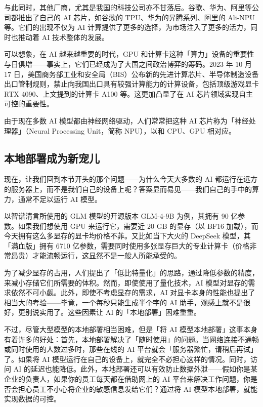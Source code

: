 与此同时，其他厂商，尤其是我国的科技公司亦不甘落后。谷歌、华为、阿里等公司都推出了自己的 AI 芯片，如谷歌的 TPU、华为的昇腾系列、阿里的 Ali-NPU 等。它们的出现不仅为 AI 计算提供了更多的选择，为市场注入了更多的活力，同时也推动着 AI 技术整体的发展。

\begin{note}
  可以想象，在 AI 越来越重要的时代，GPU 和计算卡这种「算力」设备的重要性与日俱增——事实上，它们已经成为了大国之间政治博弈的筹码。2023 年 10 月 17 日，美国商务部工业和安全局（BIS）公布新的先进计算芯片、半导体制造设备出口管制规则，禁止向我国出口具有较强计算能力的计算设备，包括顶级游戏显卡 RTX 4090、上文提到的计算卡 A100 等。这更加凸显了在 AI 芯片领域实现自主可控的重要性。
\end{note}

由于现在多数 AI 模型都由神经网络驱动，人们常常把这种 AI 芯片称为「神经处理器」（Neural Processing Unit，简称 NPU），以和 CPU、GPU 相对应。

\subsection{本地部署成为新宠儿}

现在，让我们回到本节开头的那个问题——为什么今天大多数的 AI 都运行在远方的服务器上，而不是我们自己的设备上呢？答案显而易见——我们自己的手中的算力，通常不足以运行 AI 模型。

以智谱清言所使用的 GLM 模型的开源版本 GLM-4-9B 为例，其拥有 90 亿参数。如果我们想使用 GPU 来运行它，需要近 20 GB 的显存（以 BF16 加载），而今天拥有这么多显存的显卡均价格不菲。又比如当下大火的 DeepSeek 模型，其「满血版」拥有 6710 亿参数，需要同时使用多张显存巨大的专业计算卡（价格非常昂贵）才能流畅运行，这显然不是一般人所能承受的。

为了减少显存的占用，人们提出了「低比特量化」的思路，通过降低参数的精度，来减小存储它们所需要的体积。然而，即使使用了量化技术，AI 模型对显存的需求依然不可小觑。此外，即使不考虑显存的需求，AI 对显卡本身的性能也提出了相当大的考验——毕竟，一个每秒只能生成半个字的 AI 助手，观感上就不是很好，更别说实用了。这些因素让 AI 的「本地部署」困难重重。

不过，尽管大型模型的本地部署相当困难，但是「将 AI 模型本地部署」这事本身有着许多的好处：首先，本地部署解决了「随时使用」的问题。当网络连接不通畅或同时使用的人数过多时，那些在线的 AI 平台就会「服务器繁忙，请稍后再试」了。如果将 AI 模型运行在自己的设备上，就完全不必担心这样的情况。同时，访问 AI 的延迟也能降低。此外，本地部署还可以有效防止数据外泄——假如你是某企业的负责人，如果你的员工每天都在借助网上的 AI 平台来解决工作问题，你是否会担心员工不小心将企业的敏感信息发给它们？通过将 AI 模型本地部署，就能实现数据的可控。

